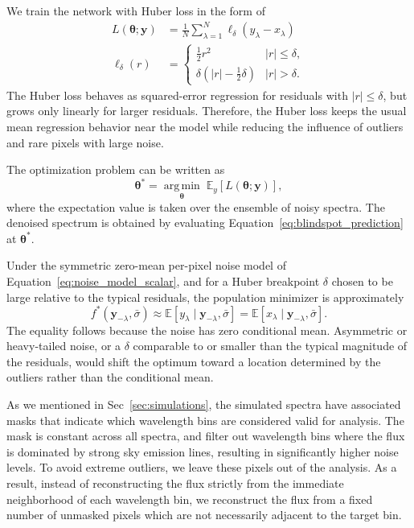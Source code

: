 \documentclass[twocolumn]{aastex7}
\newcommand{\m}[1]{\boldsymbol{#1}}
\begin{document}
We train the network with Huber loss in the form of
\begin{align}
    L(\m{\theta};\m{y})
    &= \frac{1}{N}\sum_{\lambda=1}^{N}
        \ell_{\delta}\!\left(y_{\lambda} - \hat{x}_{\lambda}\right) \\[1em]
    \ell_{\delta}(r) &=
    \begin{cases}
        \tfrac{1}{2}r^{2} & |r| \leq \delta,\\
        \delta\!\left(|r| - \tfrac{1}{2}\delta\right) & |r| > \delta.
    \end{cases}
    \label{eq:self_supervised_loss}
\end{align}
The Huber loss behaves as squared-error regression for residuals with $|r|\leq\delta$, but grows only linearly for larger residuals. Therefore, the Huber loss keeps the usual mean regression behavior near the model while reducing the influence of outliers and rare pixels with large noise.

The optimization problem can be written as
\begin{equation}
    \m{\theta}^\ast = \operatorname*{arg\,min}_{\m{\theta}}\;\mathbb{E}_{y}\!\left[L(\m{\theta};\m{y})\right],
    \label{eq:theta_star}
\end{equation}
where the expectation value is taken over the ensemble of noisy spectra. The denoised spectrum is obtained by evaluating Equation~\ref{eq:blindspot_prediction} at $\m{\theta}^\ast$.

Under the symmetric zero-mean per-pixel noise model of Equation~\ref{eq:noise_model_scalar}, and for a Huber breakpoint $\delta$ chosen to be large relative to the typical residuals, the population minimizer is approximately
\begin{equation}
    f^\ast(\m{y}_{-\lambda},\bar{\sigma})
    \approx
    \mathbb{E}\!\left[y_{\lambda}\mid \m{y}_{-\lambda},\bar{\sigma}\right]
    =
    \mathbb{E}\!\left[x_{\lambda}\mid \m{y}_{-\lambda},\bar{\sigma}\right].
    \label{eq:population_target}
\end{equation}
The equality follows because the noise has zero conditional mean. Asymmetric or heavy-tailed noise, or a $\delta$ comparable to or smaller than the typical magnitude of the residuals, would shift the optimum toward a location determined by the outliers rather than the conditional mean.

As we mentioned in Sec~\ref{sec:simulations}, the simulated spectra have associated masks that indicate which wavelength bins are considered valid for analysis. The mask is constant across all spectra, and filter out wavelength bins where the flux is dominated by strong sky emission lines, resulting in significantly higher noise levels. To avoid extreme outliers, we leave these pixels out of the analysis. As a result, instead of reconstructing the flux strictly from the immediate neighborhood of each wavelength bin, we reconstruct the flux from a fixed number of unmasked pixels which are not necessarily adjacent to the target bin.
\end{document}
